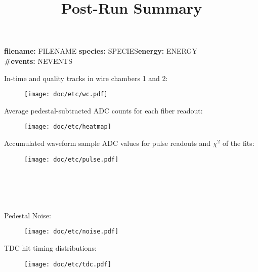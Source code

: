 \documentclass[12pt,A4paper]{article}
\title{Post-Run Summary}
\date{}
\begin{document}
        \maketitle
\vspace{-1.8 cm}
\linespread{.2}
\noindent 
\textbf{filename:} FILENAME \hspace{2mm} \textbf{species:} SPECIES\hspace{2mm}\textbf{energy:} ENERGY \hspace{2mm} \\
\noindent
\textbf{\#events:} NEVENTS
\linespread{1.5}

\noindent 
In-time and quality tracks in wire chambers 1 and 2:
\vspace{-.5 cm}
\begin{centering}
\begin{figure}[hb]
\centering
\texttt{[image: doc/etc/wc.pdf]}
\end{figure}
\end{centering}
    
\vspace{-.7 cm}
\noindent 
Average pedestal-subtracted ADC counts for each fiber readout:
\vspace{-.5cm}
\begin{figure}[hb]
\centering
\texttt{[image: doc/etc/heatmap]}
\end{figure}


\vspace{-.7 cm}
\noindent 
Accumulated waveform sample ADC values for pulse readouts and $\chi^2$ of the fits:
\vspace{-.5cm}
\begin{figure}[hb]
\hspace{-1.5cm}
\texttt{[image: doc/etc/pulse.pdf]}
\end{figure}


\newpage
\noindent 
\\\\\\\\Pedestal Noise:
\vspace{-.45 cm}
\begin{figure}[hb]
\hspace{-1.5cm}
\texttt{[image: doc/etc/noise.pdf]}
\end{figure}


\vspace{-.7 cm}
\noindent 
TDC hit timing distributions:
\vspace{-.5 cm}
\begin{figure}[hb]
\hspace{-1.1cm}
\texttt{[image: doc/etc/tdc.pdf]}
\end{figure}


     
\end{document}
